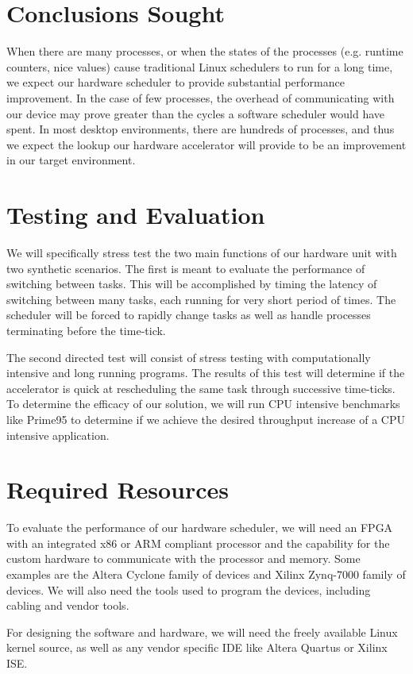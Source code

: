\documentclass[twocolumn]{article}
\begin{document}
\section*{Conclusions Sought}
When there are many processes, or when the states of the processes (e.g. runtime counters, nice values) cause traditional Linux schedulers to run for a long time, we expect our hardware scheduler to provide substantial performance improvement.
In the case of few processes, the overhead of communicating with our device may prove greater than the cycles a software scheduler would have spent.
In most desktop environments, there are hundreds of processes, and thus we expect the lookup our hardware accelerator will provide to be an improvement in our target environment.


\section*{Testing and Evaluation}
We will specifically stress test the two main functions of our hardware unit with two synthetic scenarios.
The first is meant to evaluate the performance of switching between tasks.
This will be accomplished by timing the latency of switching between many tasks, each running for very short period of times.
The scheduler will be forced to rapidly change tasks as well as handle processes terminating before the time-tick.

The second directed test will consist of stress testing with computationally intensive and long running programs.
The results of this test will determine if the accelerator is quick at rescheduling the same task through successive time-ticks.
To determine the efficacy of our solution, we will run CPU intensive benchmarks like Prime95 to determine if we achieve the desired throughput increase of a CPU intensive application.


\section*{Required Resources}
To evaluate the performance of our hardware scheduler, we will need an FPGA with an integrated x86 or ARM compliant processor and the capability for the custom hardware to communicate with the processor and memory.
Some examples are the Altera Cyclone family of devices and Xilinx Zynq-7000 family of devices. We will also need the tools used to program the devices, including cabling and vendor tools.

For designing the software and hardware, we will need the freely available Linux kernel source, as well as any vendor specific IDE like Altera Quartus or Xilinx ISE.
\end{document}
